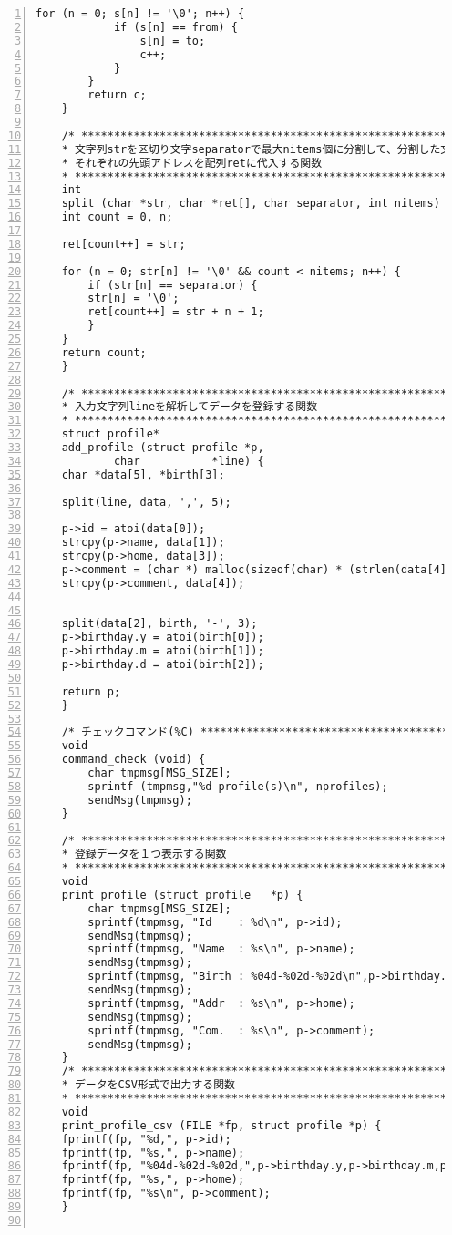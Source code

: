 \documentclass[11pt]{jarticle}
\begin{document}
\begin{lstlisting}[caption=サーバ側プログラム,label=server,numbers=left]
        for (n = 0; s[n] != '\0'; n++) {
            if (s[n] == from) {
                s[n] = to;
                c++;
            }
        }
        return c;
    }

    /* ************************************************************** *
    * 文字列strを区切り文字separatorで最大nitems個に分割して、分割した文字列の
    * それぞれの先頭アドレスを配列retに代入する関数
    * *************************************************************** */
    int
    split (char *str, char *ret[], char separator, int nitems) {
    int count = 0, n;

    ret[count++] = str;

    for (n = 0; str[n] != '\0' && count < nitems; n++) {
        if (str[n] == separator) {
        str[n] = '\0';
        ret[count++] = str + n + 1;
        }
    }
    return count;
    }

    /* ************************************************************* *
    * 入力文字列lineを解析してデータを登録する関数
    * ************************************************************** */
    struct profile*
    add_profile (struct profile *p,
            char           *line) {
    char *data[5], *birth[3];

    split(line, data, ',', 5);

    p->id = atoi(data[0]);
    strcpy(p->name, data[1]);
    strcpy(p->home, data[3]);
    p->comment = (char *) malloc(sizeof(char) * (strlen(data[4])+1));
    strcpy(p->comment, data[4]);

    
    split(data[2], birth, '-', 3);
    p->birthday.y = atoi(birth[0]);
    p->birthday.m = atoi(birth[1]);
    p->birthday.d = atoi(birth[2]);

    return p;
    }

    /* チェックコマンド(%C) ***************************************** */
    void
    command_check (void) {
        char tmpmsg[MSG_SIZE];
        sprintf (tmpmsg,"%d profile(s)\n", nprofiles);
        sendMsg(tmpmsg);
    }

    /* ********************************************************* *
    * 登録データを１つ表示する関数
    * ********************************************************** */
    void
    print_profile (struct profile	*p) {
        char tmpmsg[MSG_SIZE];
        sprintf(tmpmsg, "Id    : %d\n", p->id);
        sendMsg(tmpmsg);
        sprintf(tmpmsg, "Name  : %s\n", p->name);
        sendMsg(tmpmsg);
        sprintf(tmpmsg, "Birth : %04d-%02d-%02d\n",p->birthday.y,p->birthday.m,p->birthday.d);
        sendMsg(tmpmsg);
        sprintf(tmpmsg, "Addr  : %s\n", p->home);
        sendMsg(tmpmsg);
        sprintf(tmpmsg, "Com.  : %s\n", p->comment);
        sendMsg(tmpmsg);
    }
    /* ********************************************************** *
    * データをCSV形式で出力する関数
    * *********************************************************** */
    void
    print_profile_csv (FILE *fp, struct profile *p) {
    fprintf(fp, "%d,", p->id);
    fprintf(fp, "%s,", p->name);
    fprintf(fp, "%04d-%02d-%02d,",p->birthday.y,p->birthday.m,p->birthday.d);
    fprintf(fp, "%s,", p->home);
    fprintf(fp, "%s\n", p->comment);
    }


\end{lstlisting}
\end{document}
